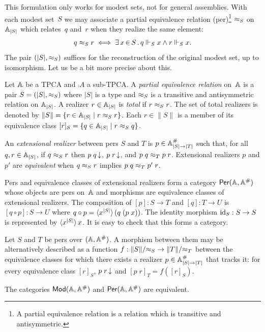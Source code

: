 This formulation only works for modest sets, not for general
assemblies. With each modest set~$S$ we may associate a partial
equivalence relation (per)\footnote{A partial equivalence relation is
  a relation which is transitive and antisymmetric.} $\per_S$ on
$\xAtyp{S}$ which relates~$q$ and~$r$ when they realize the same
element:
%
\begin{equation*}
  q \per_S r \iff
  \xsome{x}{S}{q \rz_S x \land r \rz_S x}.
\end{equation*}
%
The pair $(|S|, {\per_S})$ suffices for the reconstruction of the
original modest set, up to isomorphism. Let us be a bit more precise
about this.

Let $\AA$ be a TPCA and $\comp{A}$ a sub-TPCA. A \emph{partial
  equivalence relation} on~$\AA$ is a pair $S = (|S|, {\per_S})$ where
$|S|$ is a type and $\per_S$ is a transitive and antisymmetric
relation on $\xAtyp{S}$. A realizer $r \in \xAtyp{S}$ is \emph{total} if
$r \per_S r$. The set of total realizers is denoted by $\|S\| = \set{r
  \in \xAtyp{S} \such r \per_S r}$. Each $r \in \|S\|$ is a member of
its equivalence class $[r]_S = \set{q \in \xAtyp{S} \such r \per_S q}$.

An \emph{extensional realizer} between pers $S$ and $T$ is $p \in
\compAtyp{|S| \to |T|}$ such that, for all $q, r \in \xAtyp{S}$, if $q
\per_S r$ then $\defined{p\;q}$, $\defined{p\;r}$, and $p\;q \per_T
p\;r$. Extensional realizers $p$ and $p'$ are \emph{equivalent} when
$q \per_S r$ implies $p\;q \per_T p'\;r$.

Pers and equivalence classes of extensional realizers form a category
$\Per{\AA, \compAA}$ whose objects are pers on~$\AA$ and morphisms are
equivalence classes of extensional realizers. The composition of $[p]
: S \to T$ and $[q] : T \to U$ is $[q \circ p] : S \to U$ where $q
\circ p = \pcalam{\annot{x}{|S|}}{q\;(p\;x)}$. The identity morphism
$\id_S : S \to S$ is represented by $\xpcalam{\annot{x}{|S|}}{x}$. It
is easy to check that this forms a category.

Let $S$ and $T$ be pers over $(\AA, \compAA)$. A morphism between them
may be alternatively described as a function $f : \|S\|/{\per_S} \to
\|T\|/{\per_T}$ between the equivalence classes for which there exists
a realizer $p \in \compAtyp{|S| \to |T|}$ that tracks it: for every
equivalence class $[r]_S$, $\defined{p\;r}$ and $[p\;r]_T = f([r]_S)$.

\begin{proposition}
  The categories $\Mod{\AA, \compAA}$ and $\Per{\AA, \compAA}$ are
  equivalent.
\end{proposition}

